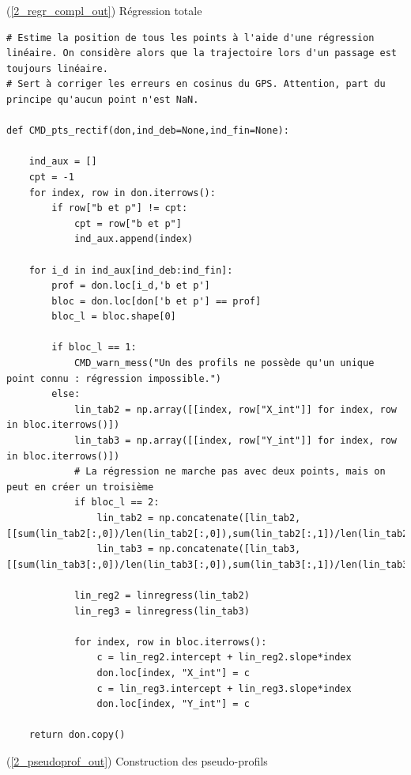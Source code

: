 \documentclass[12pt]{article}
\begin{document}
\newpage
    \label{2_regr_compl_in} (\ref{2_regr_compl_out}) Régression totale

\begin{lstlisting}
# Estime la position de tous les points à l'aide d'une régression linéaire. On considère alors que la trajectoire lors d'un passage est toujours linéaire.
# Sert à corriger les erreurs en cosinus du GPS. Attention, part du principe qu'aucun point n'est NaN.
   
def CMD_pts_rectif(don,ind_deb=None,ind_fin=None):
    
    ind_aux = []
    cpt = -1
    for index, row in don.iterrows():
        if row["b et p"] != cpt:
            cpt = row["b et p"]
            ind_aux.append(index)

    for i_d in ind_aux[ind_deb:ind_fin]:
        prof = don.loc[i_d,'b et p']
        bloc = don.loc[don['b et p'] == prof]
        bloc_l = bloc.shape[0]
        
        if bloc_l == 1:
            CMD_warn_mess("Un des profils ne possède qu'un unique point connu : régression impossible.")
        else:
            lin_tab2 = np.array([[index, row["X_int"]] for index, row in bloc.iterrows()])
            lin_tab3 = np.array([[index, row["Y_int"]] for index, row in bloc.iterrows()])
            # La régression ne marche pas avec deux points, mais on peut en créer un troisième
            if bloc_l == 2:
                lin_tab2 = np.concatenate([lin_tab2,[[sum(lin_tab2[:,0])/len(lin_tab2[:,0]),sum(lin_tab2[:,1])/len(lin_tab2[:,1])]]])
                lin_tab3 = np.concatenate([lin_tab3,[[sum(lin_tab3[:,0])/len(lin_tab3[:,0]),sum(lin_tab3[:,1])/len(lin_tab3[:,1])]]])
            
            lin_reg2 = linregress(lin_tab2)
            lin_reg3 = linregress(lin_tab3)
            
            for index, row in bloc.iterrows():
                c = lin_reg2.intercept + lin_reg2.slope*index
                don.loc[index, "X_int"] = c
                c = lin_reg3.intercept + lin_reg3.slope*index
                don.loc[index, "Y_int"] = c
    
    return don.copy()\end{lstlisting}

\newpage
    \label{2_pseudoprof_in} (\ref{2_pseudoprof_out}) Construction des pseudo-profils
\end{document}
